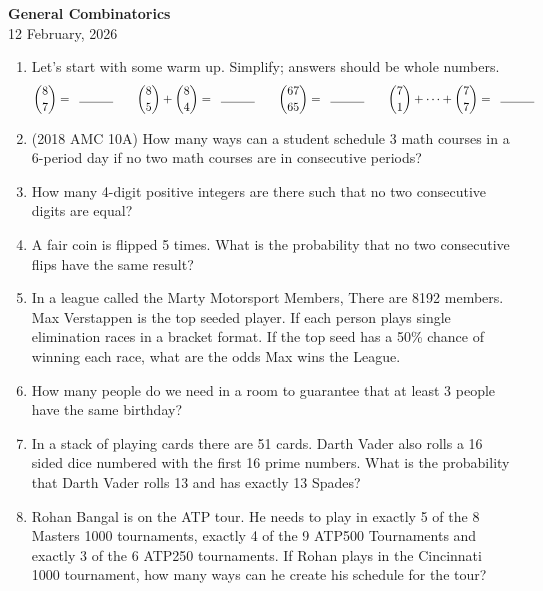 \documentclass[a4paper]{article}
\begin{document}
\begin{center}
{\Large\bfseries General Combinatorics}\\[0.25cm]
{\large 12 February, 2026}\\[1cm]
\end{center}

\begin{enumerate}[itemsep=2.5cm]
    \item Let's start with some warm up. Simplify; answers should be whole numbers.
    $$\binom{8}{7}=\;\;\rule{1cm}{0.4pt} \qquad  \binom{8}{5}+\binom{8}{4}=\;\;\rule{1cm}{0.4pt}\qquad \binom{67}{65}=\;\;\rule{1cm}{0.4pt}\qquad\binom{7}{1}+\cdots+\binom{7}{7}=\;\;\rule{1cm}{0.4pt}$$
    \item (2018 AMC 10A) How many ways can a student schedule 3 math courses in a 6-period day if no two math courses are in consecutive periods?
    \item How many 4-digit positive integers are there such that no two consecutive digits are equal?
    \item A fair coin is flipped 5 times. What is the probability that no two consecutive flips have the same result?
    \item In a league called the Marty Motorsport Members, There are 8192 members. Max Verstappen is the top seeded player. If each person plays single elimination races in a bracket format. If the top seed has a 50\% chance of winning each race, what are the odds Max wins the League.
    \item How many people do we need in a room to guarantee that at least 3 people have the same birthday?
    \item In a stack of playing cards there are 51 cards. Darth Vader also rolls a 16 sided dice numbered with the first 16 prime numbers. What is the probability that Darth Vader rolls 13 and has exactly 13 Spades?
    \item Rohan Bangal is on the ATP tour. He needs to play in exactly 5 of the 8 Masters 1000 tournaments, exactly 4 of the 9 ATP500 Tournaments and exactly 3 of the 6 ATP250 tournaments. If Rohan plays in the Cincinnati 1000 tournament, how many ways can he create his schedule for the tour? \\

\end{enumerate}
\end{document}
